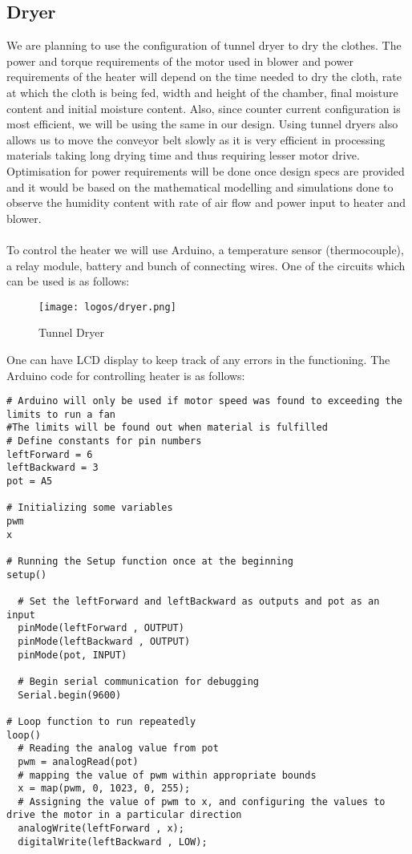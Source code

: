 \documentclass[table,french,english]{rapportCS}
\begin{document}
\subsection{Dryer}
We are planning to use the configuration of tunnel dryer to dry the clothes. The power and torque requirements of the motor used in blower and power requirements of the heater will depend on the time needed to dry the cloth, rate at which the cloth is being fed, width and height of the chamber, final moisture content and initial moisture content.
Also, since counter current configuration is most efficient, we will be using the same in our design. Using tunnel dryers also allows us to move the conveyor belt slowly as it is very efficient in processing materials taking long drying time and thus requiring lesser motor drive.\\
Optimisation for power requirements will be done once design specs are provided and it would be based on the mathematical modelling and simulations done to observe the humidity content with rate of air flow and power input to heater and blower.\\
\\
To control the heater we will use Arduino, a temperature sensor (thermocouple), a relay module, battery and bunch of connecting wires.
One of the circuits which can be used is as follows:
\vspace{1cm}
\begin{figure}[h]
    \centering
    \texttt{[image: logos/dryer.png]}
    \caption{Tunnel Dryer}
    \label{fig:outlinemindmap}
\end{figure}
\newpage
One can have LCD display to keep track of any errors in the functioning. The
Arduino code for controlling heater is as follows:
\vspace{1cm}
\begin{lstlisting}
# Arduino will only be used if motor speed was found to exceeding the limits to run a fan
#The limits will be found out when material is fulfilled
# Define constants for pin numbers
leftForward = 6
leftBackward = 3
pot = A5

# Initializing some variables
pwm
x

# Running the Setup function once at the beginning
setup() 

  # Set the leftForward and leftBackward as outputs and pot as an input
  pinMode(leftForward , OUTPUT)
  pinMode(leftBackward , OUTPUT)
  pinMode(pot, INPUT)

  # Begin serial communication for debugging
  Serial.begin(9600)

# Loop function to run repeatedly
loop()
  # Reading the analog value from pot
  pwm = analogRead(pot)
  # mapping the value of pwm within appropriate bounds
  x = map(pwm, 0, 1023, 0, 255);
  # Assigning the value of pwm to x, and configuring the values to drive the motor in a particular direction 
  analogWrite(leftForward , x);
  digitalWrite(leftBackward , LOW);
\end{lstlisting}
\end{document}
